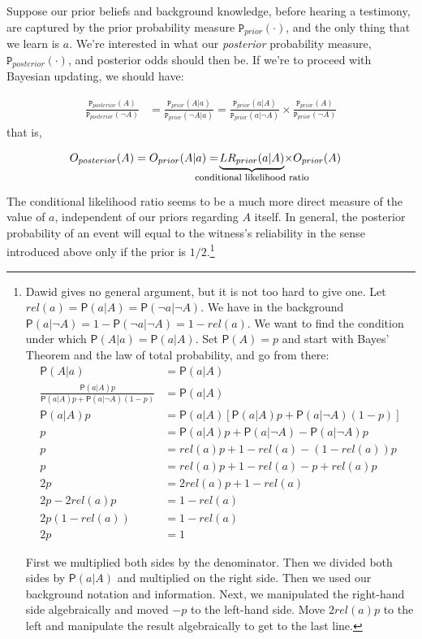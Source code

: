 \documentclass[10pt,dvipsnames,enabledeprecatedfontcommands]{scrartcl}
\newcommand{\n}{\neg}
\newcommand{\pr}[1]{\mathsf{P}(#1)}
\newcommand{\prr}[1]{\mbox{$\mathtt{P}_{prior}(#1)$}}
\newcommand{\prp}[1]{\mbox{$\mathtt{P}_{posterior}(#1)$}}
\begin{document}
Suppose our prior beliefs and background knowledge, before hearing a
testimony, are captured by the prior probability measure
\(\prr{\cdot}\), and the only thing that we learn is \(a\). We're
interested in what our \emph{posterior} probability measure,
\(\prp{\cdot}\), and posterior odds should then be. If we're to proceed
with Bayesian updating, we should have:

\vspace{-6mm}

\begin{align*}
 \frac{\prp{A}}{\prp{\n A}} & = \frac{\prr{A\vert a}}{\prr{\n A\vert a}}
 =
 \frac{\prr{a\vert A}}{\prr{a\vert \n A}}
 \times
 \frac{\prr{A}}{\prr{\n A}}
  \end{align*} that is,

\vspace{-6mm}

\begin{align}
 \label{bayesodss2}
 O_{posterior}(A)& = O_{prior}(A\vert a) = \!\!\!\!\!  \!\!\!\!\!  \!\! \!\!  \underbrace{LR_{prior}(a\vert A)}_{\mbox{\footnotesize conditional likelihood ratio}}  \!\!\!\!\!   \!\!\!\!\!  \!\! \!\!   \times  O_{prior}(A)
 \end{align}

The conditional likelihood ratio seems to be a much more direct measure
of the value of \(a\), independent of our priors regarding \(A\) itself.
In general, the posterior probability of an event will equal to the
witness's reliability in the sense introduced above only if the prior is
\(1/2\).\footnote{Dawid gives no general argument, but it is not too hard to  give one. Let $rel(a)=\pr{a\vert A}=\pr{\n a\vert \n A}$. We have in the background $\pr{a\vert \n A}=1-\pr{\n a\vert \n A}=1-rel(a)$.
 We want to find the condition under which $\pr{A\vert a} = \pr{a\vert A}$. Set $\pr{A}=p$ and  start with Bayes' Theorem and the law of total probability, and go from there:
 \begin{align*}
 \pr{A\vert a}& = \pr{a\vert A}\\
 \frac{\pr{a\vert A}p}{\pr{a\vert A}p+\pr{a\vert \n A}(1-p)} &= \pr{a\vert A} \\
 \pr{a\vert A}p & = \pr{a\vert A}[\pr{a\vert A}p+\pr{a\vert \n A}(1-p)]\\
 p & = \pr{a\vert A}p + \pr{a\vert \n A} - \pr{a\vert \n A}p\\
 p &= rel(a) p + 1-rel(a)- (1-rel(a))p\\
 p & = rel(a)p +1 - rel(a) -p +rel(a)p \\
 2p & =  2rel(a)p + 1 - rel(a)  \\
 2p - 2 rel(a)p & = 1-rel(a)\\
 2p(1-rel(a)) &= 1-rel(a)\\
 2p & = 1
 \end{align*}

\noindent  First we multiplied both sides by the denominator. Then we divided both sides by $\pr{a\vert A}$ and multiplied on the right side. Then we used our background notation and information. Next, we manipulated the right-hand side algebraically and  moved  $-p$ to the left-hand side. Move $2rel(a)p$ to the left and manipulate the result algebraically to get to the last line.}
\end{document}
